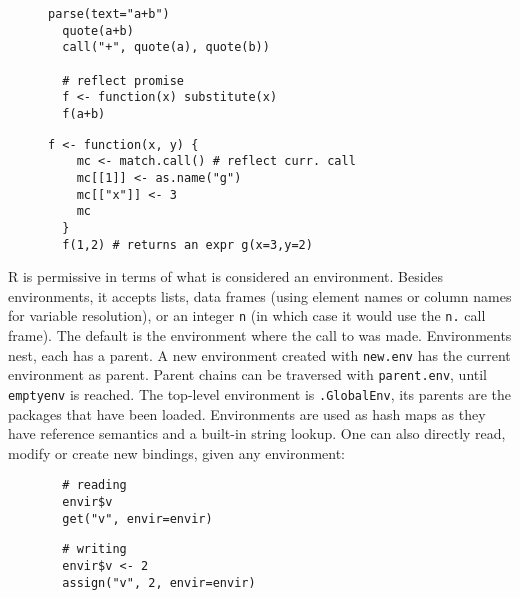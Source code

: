 \documentclass[review,screen,acmsmall]{acmart}%
\renewcommand{\k}[1]{\lstinline |#1|\xspace}
\begin{document}
\begin{figure}[htb]
\begin{minipage}{.49\textwidth}
\begin{lstlisting}[caption={Examples of calls producing expression \k{a+b}},label=lst:exprs]
  parse(text="a+b")
  quote(a+b)
  call("+", quote(a), quote(b))

  # reflect promise
  f <- function(x) substitute(x)
  f(a+b)
  \end{lstlisting}
\end{minipage}
\begin{minipage}{.49\textwidth}
  \begin{lstlisting}[caption={Example of a call reflection},label=lst:match.call]
  f <- function(x, y) {
    mc <- match.call() # reflect curr. call
    mc[[1]] <- as.name("g")
    mc[["x"]] <- 3
    mc
  }
  f(1,2) # returns an expr g(x=3,y=2)
  \end{lstlisting}
\end{minipage}
\end{figure}

R is permissive in terms of what is considered an environment. Besides
environments, it accepts lists, data frames (using element names or column names
for variable resolution), or an integer \k{n} (in which case it would use the
\k{n.} call frame). The default is the environment where the call to \eval was
made.
%
Environments nest, each has a parent. A new environment created with \k{new.env}
has the current environment as parent. Parent chains can be traversed with
\k{parent.env}, until \k{emptyenv} is reached. The top-level environment is
\k{.GlobalEnv}, its parents are the packages that have been loaded. Environments
are used as hash maps as they have reference semantics and a built-in string
lookup. One can also directly read, modify or create new bindings, given any
environment:
%
\begin{figure}[H]
\begin{minipage}{.49\textwidth}
  \begin{lstlisting}
  # reading
  envir$v
  get("v", envir=envir)
  \end{lstlisting}
\end{minipage}
\begin{minipage}{.49\textwidth}
  \begin{lstlisting}
  # writing
  envir$v <- 2
  assign("v", 2, envir=envir)
  \end{lstlisting}
\end{minipage}
\end{figure}
%
\end{document}

